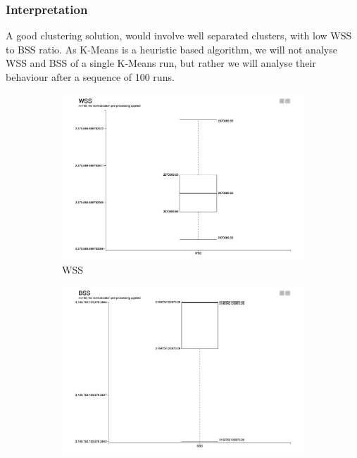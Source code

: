 \documentclass[11pt]{article}
\begin{document}
			\subsubsection*{Interpretation}
				A good clustering solution, would involve well separated clusters, with low WSS to BSS ratio\cite{???}. As K-Means is a heuristic based algorithm, we will not analyse WSS and BSS of a single K-Means run, but rather we will analyse their behaviour after a sequence of 100 runs. 
				\iffalse
				\begin{figure}[H]
					
					\centering
					\begin{subfigure}{0.4\textwidth}
						\includegraphics[width=\textwidth]{res/t1/t15/t15-WSS-plot}
						\caption{WSS}
						\label{fig:first}
					\end{subfigure}
					\hfill
					\begin{subfigure}{0.4\textwidth}
						\includegraphics[width=\textwidth]{res/t1/t15/t15-BSS-plot}

\end{subfigure}
\end{figure}
\end{document}
